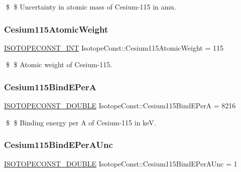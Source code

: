 \$ \$ Uncertainty in atomic mass of Cesium-\/115 in amu. \mbox{\label{group___isotope_const-_cesium-_cs115_ga15567801948a6622030123c0f74fb946}} 
\subsubsection{\texorpdfstring{Cesium115\+Atomic\+Weight}{Cesium115AtomicWeight}}
{\footnotesize\ttfamily \mbox{\hyperlink{group___isotope_const-_macros_ga5f18360b3e99483a35c32d789e62621c}{I\+S\+O\+T\+O\+P\+E\+C\+O\+N\+S\+T\+\_\+\+I\+NT}} Isotope\+Const\+::\+Cesium115\+Atomic\+Weight = 115}

\$ \$ Atomic weight of Cesium-\/115. \mbox{\label{group___isotope_const-_cesium-_cs115_ga28a34d9fb4561d339d74c39de166f154}} 
\subsubsection{\texorpdfstring{Cesium115\+Bind\+E\+PerA}{Cesium115BindEPerA}}
{\footnotesize\ttfamily \mbox{\hyperlink{group___isotope_const-_macros_ga8f45a7272ce02c0b4c65c44636ed719a}{I\+S\+O\+T\+O\+P\+E\+C\+O\+N\+S\+T\+\_\+\+D\+O\+U\+B\+LE}} Isotope\+Const\+::\+Cesium115\+Bind\+E\+PerA = 8216}

\$ \$ Binding energy per A of Cesium-\/115 in keV. \mbox{\label{group___isotope_const-_cesium-_cs115_ga0aff37923ddf454bf608608534077f78}} 
\subsubsection{\texorpdfstring{Cesium115\+Bind\+E\+Per\+A\+Unc}{Cesium115BindEPerAUnc}}
{\footnotesize\ttfamily \mbox{\hyperlink{group___isotope_const-_macros_ga8f45a7272ce02c0b4c65c44636ed719a}{I\+S\+O\+T\+O\+P\+E\+C\+O\+N\+S\+T\+\_\+\+D\+O\+U\+B\+LE}} Isotope\+Const\+::\+Cesium115\+Bind\+E\+Per\+A\+Unc = 1}

